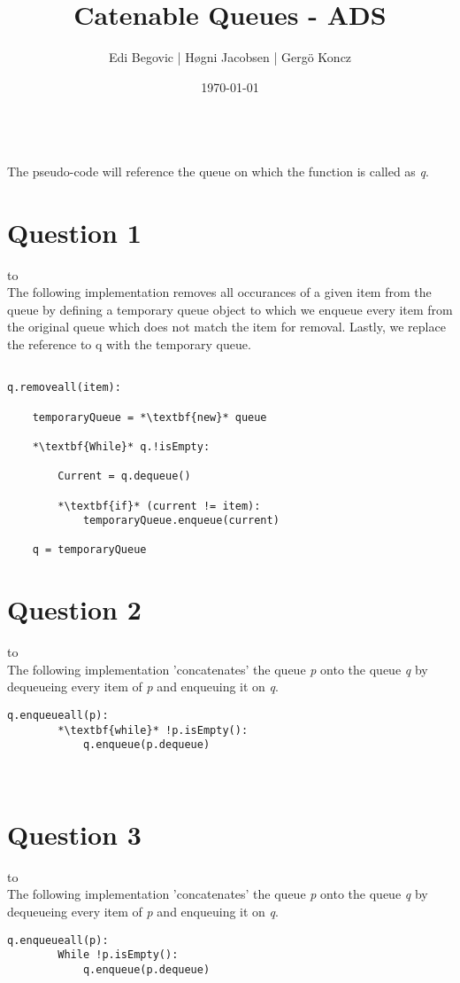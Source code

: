 \documentclass[a4paper]{article}
\title{Catenable Queues - ADS}
\author{Edi Begovic | Høgni Jacobsen | Gergö Koncz}
\date{\today}
\def\headline#1{\hbox to \hsize{\hrulefill\quad\lower.3em\hbox{#1}\quad\hrulefill}}
\begin{document}
 
\maketitle

\ \\
\noindent
The pseudo-code will reference the queue on which the function is called as \textit{q}.
\ \\
\section*{Question 1}
\headline{-} \ \\

\noindent
The following implementation removes all occurances of a given item from the queue by defining a temporary queue
object to which we enqueue every item from the original queue which does not match the item for removal. 
Lastly, we replace the reference to q with the temporary queue.

\noindent
\begin{lstlisting}[escapeinside={{*}{*}}]

q.removeall(item):

    temporaryQueue = *\textbf{new}* queue

    *\textbf{While}* q.!isEmpty:

        Current = q.dequeue()
        
        *\textbf{if}* (current != item):
            temporaryQueue.enqueue(current)
    
    q = temporaryQueue

\end{lstlisting}

\newpage
\section*{Question 2}
\headline{-} \ \\
The following implementation 'concatenates' the queue \textit{p} onto the queue \textit{q} by
dequeueing every item of \textit{p} and enqueuing it on \textit{q}.
 \\

\noindent

\begin{lstlisting}[escapeinside={{*}{*}}]
    q.enqueueall(p):
        *\textbf{while}* !p.isEmpty():
            q.enqueue(p.dequeue)
\end{lstlisting}

\ \\
\section*{Question 3}
\headline{-} \ \\
The following implementation 'concatenates' the queue \textit{p} onto the queue \textit{q} by
dequeueing every item of \textit{p} and enqueuing it on \textit{q}.
 \\

\noindent

\begin{lstlisting}[escapeinside={{*}{*}}]
    q.enqueueall(p):
        While !p.isEmpty():
            q.enqueue(p.dequeue)
\end{lstlisting}
\end{document}
